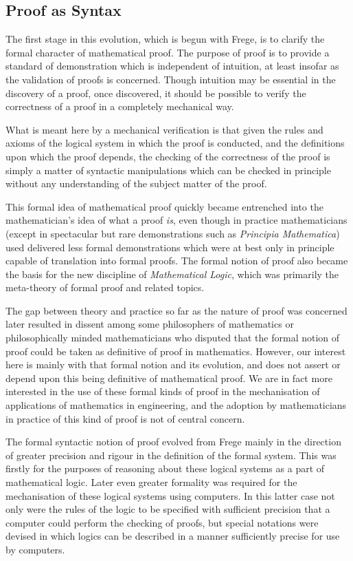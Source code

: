 \subsection{Proof as Syntax}

The first stage in this evolution, which is begun with Frege, is to clarify the formal character of mathematical proof.
The purpose of proof is to provide a standard of demonstration which is independent of intuition, at least insofar as the validation of proofs is concerned.
Though intuition may be essential in the discovery of a proof, once discovered, it should be possible to verify the correctness of a proof in a completely mechanical way.

What is meant here by a mechanical verification is that given the rules and axioms of the logical system in which the proof is conducted, and the definitions upon which the proof depends, the checking of the correctness of the proof is simply a matter of syntactic manipulations which can be checked in principle without any understanding of the subject matter of the proof.

This formal idea of mathematical proof quickly became entrenched into the mathematician's idea of what a proof {\it is}, even though in practice mathematicians (except in spectacular but rare demonstrations such as {\it Principia Mathematica}) used delivered less formal demonstrations which were at best only in principle capable of translation into formal proofs.
The formal notion of proof also became the basis for the new discipline of {\it Mathematical Logic}, which was primarily the meta-theory of formal proof and related topics.

The gap between theory and practice so far as the nature of proof was concerned later resulted in dissent among some philosophers of mathematics or philosophically minded mathematicians who disputed that the formal notion of proof could be taken as definitive of proof in mathematics.
However, our interest here is mainly with that formal notion and its evolution, and does not assert or depend upon this being definitive of mathematical proof.
We are in fact more interested in the use of these formal kinds of proof in the mechanisation of applications of mathematics in engineering, and the adoption by mathematicians in practice of this kind of proof is not of central concern.

The formal syntactic notion of proof evolved from Frege mainly in the direction of greater precision and rigour in the definition of the formal system.
This was firstly for the purposes of reasoning about these logical systems as a part of mathematical logic.
Later even greater formality was required for the mechanisation of these logical systems using computers.
In this latter case not only were the rules of the logic to be specified with sufficient precision that a computer could perform the checking of proofs, but special notations were devised in which logics can be described in a manner sufficiently precise for use by computers.

